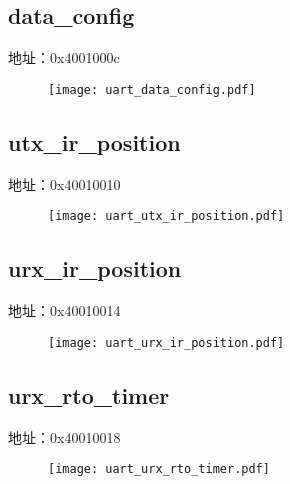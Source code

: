 \subsection{data\_config}
\label{uart-data-config}
地址：0x4001000c
 \begin{figure}[H]
\texttt{[image: uart\_data\_config.pdf]}
\end{figure}

\subsection{utx\_ir\_position}
\label{uart-utx-ir-position}
地址：0x40010010
 \begin{figure}[H]
\texttt{[image: uart\_utx\_ir\_position.pdf]}
\end{figure}

\subsection{urx\_ir\_position}
\label{uart-urx-ir-position}
地址：0x40010014
 \begin{figure}[H]
\texttt{[image: uart\_urx\_ir\_position.pdf]}
\end{figure}

\subsection{urx\_rto\_timer}
\label{uart-urx-rto-timer}
地址：0x40010018
 \begin{figure}[H]
\texttt{[image: uart\_urx\_rto\_timer.pdf]}
\end{figure}

